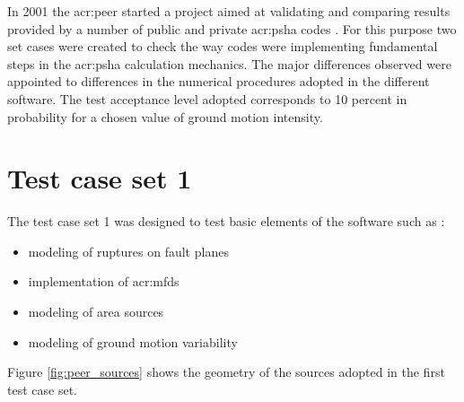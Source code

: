 %
In 2001 the \gls{acr:peer} started a project aimed at validating
and comparing results provided by a number of public and private 
\gls{acr:psha} codes \parencite[for a comprehensive list see][]{thomas2010}.
%
For this purpose two set cases were created to check the way 
codes were implementing fundamental steps in the \gls{acr:psha}
calculation mechanics.
%
The major differences observed were appointed to differences in 
the numerical procedures adopted in the different software.
% 
The test acceptance level adopted corresponds to 10 percent in 
probability for a chosen value of ground motion intensity.
%
\section{Test case set 1}
The test case set 1 was designed to test basic elements of the 
software such as \parencite{thomas2010}:
\begin{itemize}
\item modeling of ruptures on fault planes 
\item implementation of \glspl{acr:mfd}
\item modeling of area sources
\item modeling of ground motion variability
\end{itemize}
Figure \ref{fig:peer_sources} shows the geometry of the sources adopted 
in the first test case set. 
